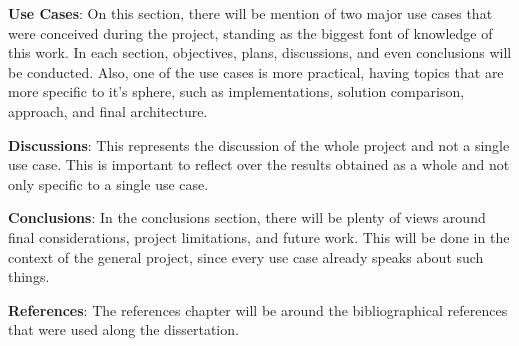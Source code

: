 \textbf {Use Cases}: On this section, there will be mention of two major use cases that were conceived during the project, standing as the biggest font of knowledge of this work. In each section, objectives, plans, discussions, and even conclusions will be conducted. Also, one of the use cases is more practical, having topics that are more specific to it's sphere, such as implementations, solution comparison, approach, and final architecture.

\textbf{Discussions}: This represents the discussion of the whole project and not a single use case. This is important to reflect over the results obtained as a whole and not only specific to a single use case.

\textbf {Conclusions}: In the conclusions section, there will be plenty of views around final considerations, project limitations, and future work. This will be done in the context of the general project, since every use case already speaks about such things.

\textbf{References}: The references chapter will be around the bibliographical references that were used along the dissertation.